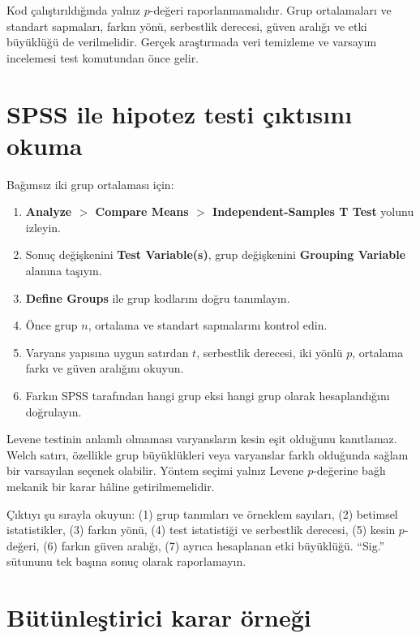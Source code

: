 Kod çalıştırıldığında yalnız $p$-değeri raporlanmamalıdır. Grup ortalamaları
ve standart sapmaları, farkın yönü, serbestlik derecesi, güven aralığı ve etki
büyüklüğü de verilmelidir. Gerçek araştırmada veri temizleme ve varsayım
incelemesi test komutundan önce gelir.

\section{SPSS ile hipotez testi çıktısını okuma}

Bağımsız iki grup ortalaması için:

\begin{enumerate}
  \item \textbf{Analyze $>$ Compare Means $>$ Independent-Samples T Test} yolunu izleyin.
  \item Sonuç değişkenini \textbf{Test Variable(s)}, grup değişkenini \textbf{Grouping Variable} alanına taşıyın.
  \item \textbf{Define Groups} ile grup kodlarını doğru tanımlayın.
  \item Önce grup $n$, ortalama ve standart sapmalarını kontrol edin.
  \item Varyans yapısına uygun satırdan $t$, serbestlik derecesi, iki yönlü $p$, ortalama farkı ve güven aralığını okuyun.
  \item Farkın SPSS tarafından hangi grup eksi hangi grup olarak hesaplandığını doğrulayın.
\end{enumerate}

Levene testinin anlamlı olmaması varyansların kesin eşit olduğunu kanıtlamaz.
Welch satırı, özellikle grup büyüklükleri veya varyanslar farklı olduğunda
sağlam bir varsayılan seçenek olabilir. Yöntem seçimi yalnız Levene
$p$-değerine bağlı mekanik bir karar hâline getirilmemelidir.

\begin{outputguidebox}
Çıktıyı şu sırayla okuyun: (1) grup tanımları ve örneklem sayıları, (2)
betimsel istatistikler, (3) farkın yönü, (4) test istatistiği ve serbestlik
derecesi, (5) kesin $p$-değeri, (6) farkın güven aralığı, (7) ayrıca
hesaplanan etki büyüklüğü. ``Sig.'' sütununu tek başına sonuç olarak
raporlamayın.
\end{outputguidebox}

\section{Bütünleştirici karar örneği}

